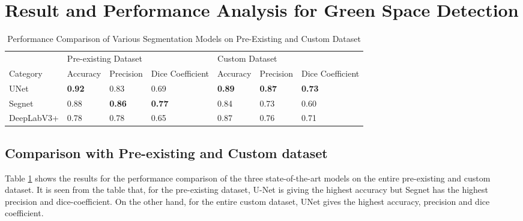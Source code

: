 \section{Result and Performance Analysis for Green Space Detection}

\begin{table}[h]
\centering
\caption{Performance Comparison of Various Segmentation Models on Pre-Existing and Custom Dataset}
\label{tab2}
\small %
\begin{tabular}{p{.13\linewidth}p{.12\linewidth}p{.12\linewidth}p{.11\linewidth}p{.12\linewidth}p{.12\linewidth}p{.11\linewidth}}
    \hline
    \textbf{ }&
    \multicolumn{3}{l}{Pre-existing Dataset} & \multicolumn{3}{l}{Custom Dataset}\\
    \cline{1-7}
    Category & Accuracy & Precision & Dice Coefficient  & Accuracy & Precision & Dice Coefficient  \\
    
    \hline
    UNet    
     & \textbf{0.92}
     & 0.83
     & 0.69
     & \textbf{0.89}
     &  \textbf{0.87}
     & \textbf{0.73}    
\\
Segnet
     & 0.88
     & \textbf{0.86}
     &  \textbf{0.77}
     &  0.84
     &  0.73
     &  0.60   
\\
DeepLabV3+
     & 0.78
     & 0.78
     & 0.65
     &  0.87
     &  0.76
     &  0.71  
\\
\hline
\end{tabular}
\end{table}



\subsection{Comparison with Pre-existing and Custom dataset}
Table \ref{tab2} shows the results for the performance comparison of the three state-of-the-art models on the entire pre-existing and custom dataset. It is seen from the table that, for the pre-existing dataset, U-Net is giving the highest accuracy but Segnet has the highest precision and dice-coefficient. On the other hand, for the entire custom dataset, UNet gives the highest accuracy, precision and dice coefficient.


